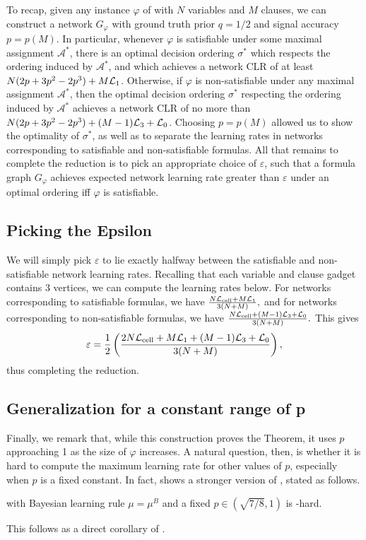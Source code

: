 To recap, given any instance $\varphi$ of \sat{} with $N$ variables and $M$ clauses, we can construct a network $G_\varphi$ with ground truth prior $q = 1/2$ and signal accuracy $p = p(M)$. In particular, whenever $\varphi$ is satisfiable under some maximal assignment $\mathcal{A}^*$, there is an optimal decision ordering $\sigma^*$ which respects the ordering induced by $\mathcal{A}^*$, and which achieves a network CLR of at least $N(2p+3p^2-2p^3) + M\mathcal{L}_1$. Otherwise, if $\varphi$ is non-satisfiable under any maximal assignment $\mathcal{A}^*$, then the optimal decision ordering $\sigma^*$ respecting the ordering induced by $\mathcal{A}^*$ achieves a network CLR of no more than $N(2p+3p^2-2p^3) + (M-1)\mathcal{L}_3 + \mathcal{L}_0$. Choosing $p = p(M)$ allowed us to show the optimality of $\sigma^*$, as well as to separate the learning rates in networks corresponding to satisfiable and non-satisfiable formulas. All that remains to complete the reduction is to pick an appropriate choice of $\varepsilon$, such that a formula graph $G_\varphi$ achieves expected network learning rate greater than $\varepsilon$ under an optimal ordering iff $\varphi$ is satisfiable.

\subsection{Picking the Epsilon}\label{sec:bayes_epsilon}
We will simply pick $\varepsilon$ to lie exactly halfway between the satisfiable and non-satisfiable network learning rates. Recalling that each variable and clause gadget contains $3$ vertices, we can compute the learning rates below. For networks corresponding to satisfiable formulas, we have $\frac{N\mathcal{L}_{\text{cell}} + M\mathcal{L}_1}{3(N+M)},$ and for networks corresponding to non-satisfiable formulas, we have $\frac{N\mathcal{L}_{\text{cell}} + (M-1)\mathcal{L}_3 + \mathcal{L}_0}{3(N+M)}.$ This gives 
\begin{align*}
    \varepsilon = \frac{1}{2}\left(\frac{2N\mathcal{L}_{\text{cell}} + M\mathcal{L}_1 + (M-1)\mathcal{L}_3 + \mathcal{L}_0}{3(N+M)}\right),
\end{align*}
thus completing the reduction. 

\subsection{Generalization for a constant range of p}

Finally, we remark that, while this construction proves the Theorem, it uses $ p $ approaching 1 as the size of $ \varphi $ increases.
A natural question, then, is whether it is hard to compute the maximum learning rate for other values of $p$, especially when $ p $ is a fixed constant.
In fact,  shows a stronger version of , stated as follows. 

\begin{theorem}[ ]
	\netlearn{} with Bayesian learning rule $\mu = \mu^B$ and a fixed $ p \in ( \sqrt{7/8},1 ) $ is \np-hard.
\end{theorem}

This follows as a direct corollary of .


